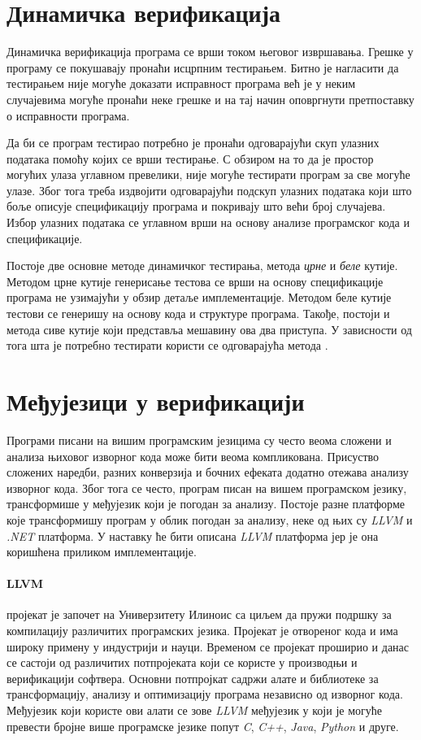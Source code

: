 \documentclass[12pt,oneside]{memoir}
\begin{document}
\section{Динамичка верификација}
  Динамичка верификација програма се врши током његовог извршавања. Грешке у програму се покушавају пронаћи исцрпним тестирањем. Битно је нагласити да тестирањем није могуће доказати исправност програма већ је у неким случајевима могуће пронаћи неке грешке и на тај начин оповргнути претпоставку о исправности програма. 
  
   Да би се програм тестирао потребно је пронаћи одговарајући скуп улазних података помоћу којих се врши тестирање.  С обзиром на то да је простор могућих улаза углавном превелики, није могуће тестирати програм за све могуће улазе. Због тога треба издвојити одговарајући подскуп улазних података који што боље описује спецификацију програма и покривају што већи број случајева. Избор улазних података се углавном врши на основу анализе програмског кода и спецификације. 
   
    Постоје две основне методе динамичког тестирања, метода \textit{црне} и 
 \textit{беле} кутије.  Методом црне кутије генерисање тестова се врши на основу спецификације програма не узимајући у обзир детаље имплементације. Методом беле кутије тестови се генеришу на основу кода и структуре програма. Такође, постоји и метода сиве кутије који представља мешавину ова два приступа. У зависности од тога шта је потребно тестирати користи се одговарајућа метода \cite{testing}. 
  
  \section{Међујезици у верификацији}
  
  Програми писани на вишим програмским језицима су често веома сложени и анализа њиховог изворног кода може бити веома компликована. Присуство сложених наредби, разних конверзија и бочних ефеката додатно отежава анализу изворног кода. Због тога се често, програм писан на вишем програмском језику, трансформише у међујезик који је погодан за анализу. Постоје разне платформе које трансформишу програм у облик погодан за анализу, неке од њих су \textit{LLVM} и \textit{.NET} платформа. У наставку ће бити описана \textit{LLVM} платформа јер је она коришћена приликом имплементације.
  
  \paragraph{LLVM} \cite{llvm} пројекат је започет на Универзитету Илиноис са циљем да пружи подршку за компилацију различитих програмских језика. Пројекат је отвореног кода и има широку примену у индустрији и науци. Временом се пројекат проширио и данас се састоји од различитих потпројеката који се користе у производњи и верификацији софтвера. Основни потпројкат садржи алате и библиотеке за трансформацију, анализу и оптимизацију програма независно од изворног кода. Међујезик који користе ови алати се зове \textit{LLVM} међујезик у који је могуће превести бројне више програмске језике попут \textit{C}, \textit{C++}, \textit{Java}, \textit{Python} и друге.
  
\end{document}
